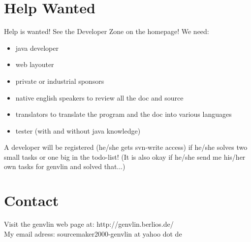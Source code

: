 \documentclass[12pt]{article}
\begin{document}
\section{Help Wanted}
Help is wanted! See the Developer Zone on the homepage! We need:\\
\begin{itemize}
\item java developer
\item web layouter
\item private or industrial sponsors
\item native english speakers to review all the doc and source
\item translators to translate the program and the doc into various languages
\item tester (with and without java knowledge)
\end{itemize}
A developer will be registered (he/she gets svn-write access) if he/she solves two small tasks or one big in the todo-list! (It is also okay if he/she send me his/her own tasks for genvlin and solved that...)
\section{Contact}
\label{contact}
Visit the genvlin web page at: http://genvlin.berlios.de/\\
My email adress: sourcemaker2000-genvlin at yahoo dot de\\
\end{document}
